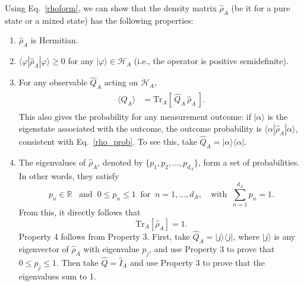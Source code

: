 \documentclass[prx,12pt]{revtex4-2}
\begin{document}
Using Eq.~\eqref{rhoform}, we can show that the density matrix
$\hat{\rho}_A$ (be it for a pure state or a mixed state) has the
following properties:
\begin{enumerate}
\item $\hat{\rho}_A$ is Hermitian.

\item $\langle\varphi|\hat{\rho}_A|\varphi\rangle \ge 0$ for any
  $|\varphi\rangle \in \mathscr{H}_A$ (i.e., the operator is positive
  semidefinite).

\item For any observable $\hat{Q}_A$ acting on $\mathscr{H}_A$,
  \begin{align}
    \begin{aligned}
      \langle Q_A \rangle
      &= \mathrm{Tr}_A\left[\,\hat{Q}_A \,\hat{\rho}_A\,\right].
    \end{aligned}
    \label{prop3}
  \end{align}
  This also gives the probability for any measurement outcome: if
  $|\alpha\rangle$ is the eigenstate associated with the outcome, the
  outcome probability is $\langle\alpha|\hat\rho_A|\alpha\rangle$,
  consistent with Eq.~\eqref{rho_prob}.  To see this, take $\hat{Q}_A
  = |\alpha\rangle \langle \alpha|$.
  
\item The eigenvalues of $\hat{\rho}_A$, denoted by $\{p_1, p_2,
  \dots, p_{d_A}\}$, form a set of probabilities.  In other words,
  they satisfy
  \begin{equation}
    p_n \in \mathbb{R} \;\;\;\mathrm{and}\;\; 0 \le p_n \le 1 \;\;
    \mathrm{for}\;\; n = 1,\dots,d_A,
    \quad\mathrm{with}\;\; \sum_{n=1}^{d_A} p_n = 1.
    \label{trrho_reduced}    
  \end{equation}
  From this, it directly follows that
  \begin{equation}
    \mathrm{Tr}_A[\hat\rho_A] = 1.
  \end{equation}
  Property 4 follows from Property 3.  First, take $\hat{Q}_A =
  |j\rangle\langle j|$, where $|j\rangle$ is any eigenvector of
  $\hat\rho_A$ with eigenvalue $p_j$, and use Property 3 to prove that
  $0 \le p_j \le 1$.  Then take $\hat{Q} = \hat{I}_A$ and use Property
  3 to prove that the eigenvalues sum to 1.
\end{enumerate}
\end{document}
